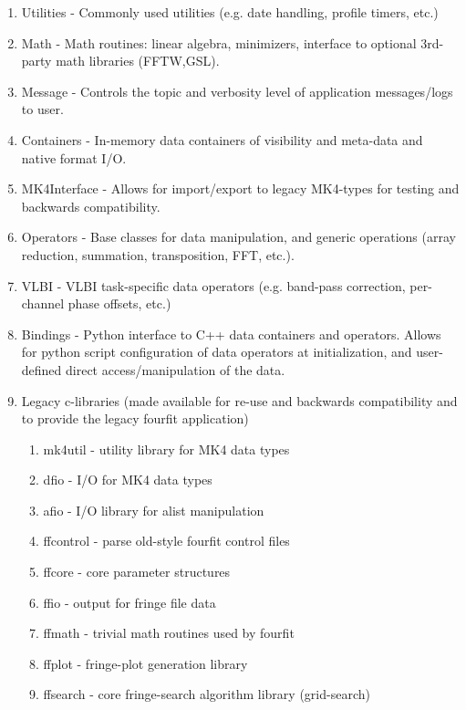 \documentclass[hidelinks]{article}
\begin{document}
\begin{enumerate}
     \item Utilities - Commonly used utilities (e.g. date handling, profile timers, etc.)
     \item Math - Math routines: linear algebra, minimizers, interface to optional 3rd-party math libraries (FFTW,GSL).
     \item Message - Controls the topic and verbosity level of application messages/logs to user.
     \item Containers - In-memory data containers of visibility and meta-data and native format I/O.
     \item MK4Interface - Allows for import/export to legacy MK4-types for testing and backwards compatibility.
     \item Operators - Base classes for data manipulation, and generic operations (array reduction, summation, transposition, FFT, etc.).
     \item VLBI - VLBI task-specific data operators (e.g. band-pass correction, per-channel phase offsets, etc.)
     \item Bindings - Python interface to C++ data containers and operators. Allows for python script configuration of data 
     operators at initialization, and user-defined direct access/manipulation of the data.
    \item  Legacy c-libraries (made available for re-use and backwards compatibility and to provide the legacy fourfit application)
    \begin{enumerate}
        \item mk4util - utility library for MK4 data types
        \item dfio - I/O for MK4 data types
        \item afio - I/O library for alist manipulation
        \item ffcontrol - parse old-style fourfit control files 
        \item ffcore - core parameter structures
        \item ffio - output for fringe file data
        \item ffmath - trivial math routines used by fourfit
        \item ffplot - fringe-plot generation library 
        \item ffsearch - core fringe-search algorithm library (grid-search)
    \end{enumerate}
\end{enumerate}
\end{document}
